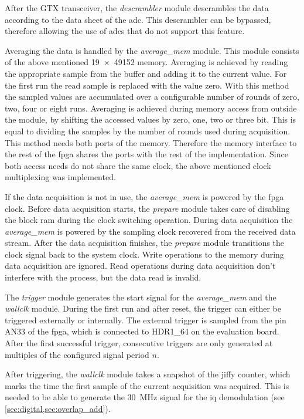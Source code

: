 \documentclass[12pt,a4paper,parskip=full,abstract=true,BCOR=12mm,twoside,open=right]{scrreprt}
\def\device#1{\textit{#1}}
\begin{document}
After the GTX transceiver, the \device{descrambler} module descrambles the data
according to the data sheet of the \gls{adc}\cite{ltc2274}. This descrambler
can be bypassed, therefore allowing the use of \glspl{adc} that do not support
this feature.

Averaging the data is handled by the \device{average\_mem} module. This module
consists of the above mentioned \SI[product-units=brackets]{19 x 49152}{\bit} memory. Averaging is achieved
by reading the appropriate sample from the buffer and adding it to the current value.
For the first run the read sample is replaced with the value zero. With this method
the sampled values are accumulated over a configurable number of rounds of zero, two,
four or eight runs. Averaging is achieved during memory access from outside the module,
by shifting the accessed values by zero, one, two or three bit. This is equal to dividing
the samples by the number of rounds used during acquisition. This method needs
both ports of the memory. Therefore the memory interface to the rest of the \gls{fpga}
shares the ports with the rest of the implementation. Since both access needs do
not share the same clock, the above mentioned clock multiplexing was implemented.

If the data acquisition is not in use, the \device{average\_mem} is powered by
the \gls{fpga} clock. Before data acquisition starts, the \device{prepare} module
takes care of disabling the block \gls{ram} during the clock switching operation.
During data acquisition the \device{average\_mem} is powered by the sampling clock
recovered from the received data stream. After the data acquisition finishes, the
\device{prepare} module transitions the clock signal back to the system clock.
Write operations to the memory during data acquisition are ignored. Read operations
during data acquisition don't interfere with the process, but the data read is invalid.

The \device{trigger} module generates the start signal for the \device{average\_mem}
and the \device{wallclk} module. During the first run and after reset, the trigger can either be triggered
externally or internally. The external trigger is sampled from the pin AN33 of the
\gls{fpga}, which is connected to HDR1\_64 on the evaluation board. After the first
successful trigger, consecutive triggers are only generated at multiples of the configured signal period $n$.

After triggering, the \device{wallclk} module takes a snapshot of the
jiffy counter, which marks the time the first sample of the current acquisition
was acquired. This is needed to be able to generate the \SI{30}{\mega\hertz}
signal for the \gls{iq} demodulation (see \cref{sec:digital,sec:overlap_add}).
\end{document}
